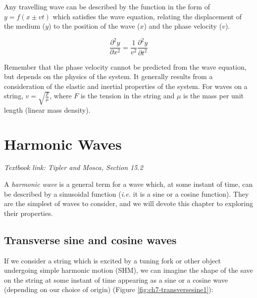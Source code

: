 \documentclass[
]{book}
\begin{document}
Any travelling wave can be described by the function in the form of \(y = f(x \pm vt)\) which satisfies the wave equation, relating the displacement of the medium (\(y\)) to the position of the wave (\(x\)) and the phase velocity (\(v\)).

\begin{equation}
\frac{\partial^2 y}{\partial x^2} = \frac{1}{v^2} \frac{\partial^2 y}{\partial t^2}
\end{equation}

Remember that the phase velocity cannot be predicted from the wave equation, but depends on the physics of the system. It generally results from a consideration of the elastic and inertial properties of the system. For waves on a string, \(v = \sqrt{\frac{F}{\mu}}\), where \(F\) is the tension in the string and \(\mu\) is the mass per unit length (linear mass density).

\hypertarget{sec-ch7-harmonicwaves}{%
\chapter{Harmonic Waves}\label{sec-ch7-harmonicwaves}}

\emph{Textbook link: Tipler and Mosca, Section 15.2}

A \emph{harmonic wave} is a general term for a wave which, at some instant of time, can be described by a sinusoidal function (\emph{i.e.} it is a sine or a cosine function). They are the simplest of waves to consider, and we will devote this chapter to exploring their properties.

\hypertarget{sec-ch7-sinecosine}{%
\section{Transverse sine and cosine waves}\label{sec-ch7-sinecosine}}

If we consider a string which is excited by a tuning fork or other object undergoing simple harmonic motion (SHM), we can imagine the shape of the save on the string at some instant of time appearing as a sine or a cosine wave (depending on our choice of origin) (Figure \ref{fig:ch7-transversesine1}):
\end{document}
